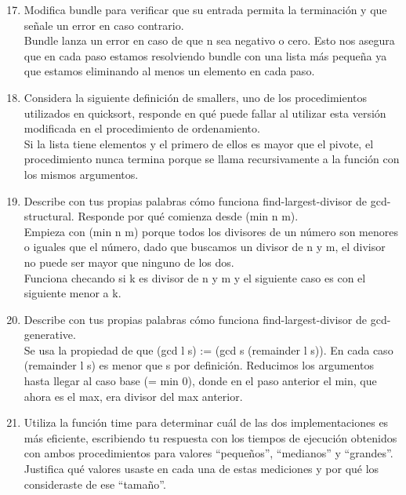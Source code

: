 \documentclass[12pt]{article}
\begin{document}
\begin{enumerate}
\setcounter{enumi}{16}
		\item{Modifica bundle para verificar que su entrada permita la terminación y que señale un error en caso contrario.}\\
				Bundle lanza un error en caso de que n sea negativo o cero. Esto nos asegura que en cada paso estamos resolviendo bundle con una lista
				m\'as peque\~na ya que estamos eliminando al menos un elemento en cada paso.

		\item{Considera la siguiente definición de smallers, uno de los procedimientos utilizados en quicksort, responde en qué puede fallar al 
				utilizar esta versión modificada en el procedimiento de ordenamiento.}\\
				
				Si la lista tiene elementos y el primero de ellos es mayor que el pivote, el procedimiento nunca termina porque se llama recursivamente a la
				funci\'on con los mismos argumentos.

		\item{Describe con tus propias palabras cómo funciona find-largest-divisor de gcd-structural. Responde por qué comienza desde (min n m).}\\
				Empieza con (min n m) porque todos los divisores de un n\'umero son menores o iguales que el n\'umero, dado que buscamos un divisor
				de n y m, el divisor no puede ser mayor que ninguno de los dos.\\

				Funciona checando si k es divisor de n y m y el siguiente caso es con el siguiente menor a k.\\

		\item{Describe con tus propias palabras cómo funciona find-largest-divisor de gcd-generative.}\\
				Se usa la propiedad de que (gcd l s) := (gcd s (remainder l s)). En cada caso (remainder l s) es menor que s por definici\'on. Reducimos los
				argumentos hasta llegar al caso base (= min 0), donde en el paso anterior el min, que ahora es el max,  era divisor del max anterior.\\

		\item{Utiliza la función time para determinar cuál de las dos implementaciones es más eficiente, escribiendo tu respuesta con los tiempos de ejecución 
				obtenidos con ambos procedimientos para valores “pequeños”, “medianos” y “grandes”. Justifica qué valores usaste en cada una de estas 
				mediciones y por qué los consideraste de ese “tamaño”.}\\


\end{enumerate}
\end{document}
